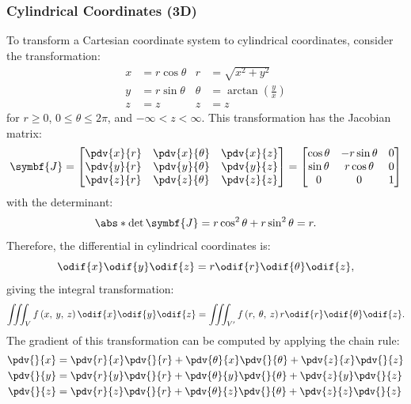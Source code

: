 \documentclass{article}
\begin{document}
\subsubsection{Cylindrical Coordinates (3D)}
To transform a Cartesian coordinate system to cylindrical coordinates,
consider the transformation:
\begin{align*}
    x & = r \cos{\theta} & r      & = \sqrt{x^2 + y^2}                    \\
    y & = r \sin{\theta} & \theta & = \arctan{\left( \frac{y}{x} \right)} \\
    z & = z              & z      & = z
\end{align*}
for \(r \geqslant 0\), \(0 \leqslant \theta \leqslant 2\pi\), and \(-\infty < z < \infty\).
This transformation has the Jacobian matrix:
\begin{equation*}
    \symbf{J} =
    \begin{bmatrix}
        \displaystyle\pdv{x}{r} & \displaystyle\pdv{x}{\theta} & \displaystyle\pdv{x}{z} \\
        \displaystyle\pdv{y}{r} & \displaystyle\pdv{y}{\theta} & \displaystyle\pdv{y}{z} \\
        \displaystyle\pdv{z}{r} & \displaystyle\pdv{z}{\theta} & \displaystyle\pdv{z}{z}
    \end{bmatrix}
    =
    \begin{bmatrix}
        \cos{\theta} & -r \sin{\theta} & 0 \\
        \sin{\theta} & r \cos{\theta}  & 0 \\
        0            & 0               & 1
    \end{bmatrix}
\end{equation*}
with the determinant:
\begin{equation*}
    \abs*{\det{\symbf{J}}} = r \cos^2{\theta} + r \sin^2{\theta} = r.
\end{equation*}
Therefore, the differential in cylindrical coordinates is:
\begin{equation*}
    \odif{x} \odif{y} \odif{z} = r \odif{r} \odif{\theta} \odif{z},
\end{equation*}
giving the integral transformation:
\begin{equation*}
    \iiint_{V} f\left( x, \: y, \: z \right) \odif{x} \odif{y} \odif{z} = \iiint_{V'} f\left( r, \: \theta, \: z \right) r \odif{r} \odif{\theta} \odif{z}.
\end{equation*}
The gradient of this transformation can be computed by applying the
chain rule:
\begin{align*}
    \pdv{}{x} & = \pdv{r}{x} \pdv{}{r} + \pdv{\theta}{x} \pdv{}{\theta} + \pdv{z}{x} \pdv{}{z} \\
    \pdv{}{y} & = \pdv{r}{y} \pdv{}{r} + \pdv{\theta}{y} \pdv{}{\theta} + \pdv{z}{y} \pdv{}{z} \\
    \pdv{}{z} & = \pdv{r}{z} \pdv{}{r} + \pdv{\theta}{z} \pdv{}{\theta} + \pdv{z}{z} \pdv{}{z}
\end{align*}
\end{document}
